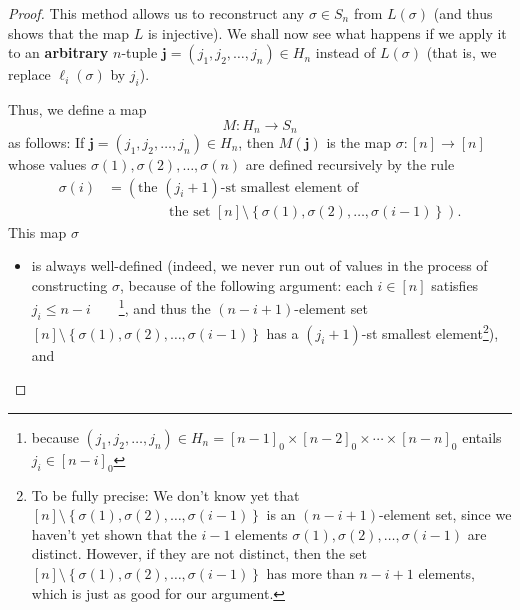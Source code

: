 \begin{proof}
This method allows us to reconstruct any $\sigma\in S_{n}$ from $L\left(
\sigma\right)  $ (and thus shows that the map $L$ is injective). We shall now
see what happens if we apply it to an \textbf{arbitrary} $n$-tuple
$\mathbf{j}=\left(  j_{1},j_{2},\ldots,j_{n}\right)  \in H_{n}$ instead of
$L\left(  \sigma\right)  $ (that is, we replace $\ell_{i}\left(
\sigma\right)  $ by $j_{i}$).

Thus, we define a map%
\[
M:H_{n}\rightarrow S_{n}%
\]
as follows: If $\mathbf{j}=\left(  j_{1},j_{2},\ldots,j_{n}\right)  \in H_{n}%
$, then $M\left(  \mathbf{j}\right)  $ is the map $\sigma:\left[  n\right]
\rightarrow\left[  n\right]  $ whose values $\sigma\left(  1\right)
,\sigma\left(  2\right)  ,\ldots,\sigma\left(  n\right)  $ are defined
recursively by the rule%
\begin{align}
\sigma\left(  i\right)   &  =\left(  \text{the }\left(  j_{i}+1\right)
\text{-st smallest element of}\right. \nonumber\\
&  \ \ \ \ \ \ \ \ \ \ \ \ \ \ \ \ \ \ \ \ \left.  \text{the set }\left[
n\right]  \setminus\left\{  \sigma\left(  1\right)  ,\sigma\left(  2\right)
,\ldots,\sigma\left(  i-1\right)  \right\}  \right)  .
\label{pf.thm.perm.lehmer.bij.1st.6}%
\end{align}
This map $\sigma$

\begin{itemize}
\item is always well-defined (indeed, we never run out of values in the
process of constructing $\sigma$, because of the following argument: each
$i\in\left[  n\right]  $ satisfies $j_{i}\leq n-i$\ \ \ \ \footnote{because
$\left(  j_{1},j_{2},\ldots,j_{n}\right)  \in H_{n}=\left[  n-1\right]
_{0}\times\left[  n-2\right]  _{0}\times\cdots\times\left[  n-n\right]  _{0}$
entails $j_{i}\in\left[  n-i\right]  _{0}$}, and thus the $\left(
n-i+1\right)  $-element set $\left[  n\right]  \setminus\left\{  \sigma\left(
1\right)  ,\sigma\left(  2\right)  ,\ldots,\sigma\left(  i-1\right)  \right\}
$ has a $\left(  j_{i}+1\right)  $-st smallest element\footnote{To be fully
precise: We don't know yet that $\left[  n\right]  \setminus\left\{
\sigma\left(  1\right)  ,\sigma\left(  2\right)  ,\ldots,\sigma\left(
i-1\right)  \right\}  $ is an $\left(  n-i+1\right)  $-element set, since we
haven't yet shown that the $i-1$ elements $\sigma\left(  1\right)
,\sigma\left(  2\right)  ,\ldots,\sigma\left(  i-1\right)  $ are distinct.
However, if they are not distinct, then the set $\left[  n\right]
\setminus\left\{  \sigma\left(  1\right)  ,\sigma\left(  2\right)
,\ldots,\sigma\left(  i-1\right)  \right\}  $ has more than $n-i+1$ elements,
which is just as good for our argument.}), and


\end{itemize}
\end{proof}
